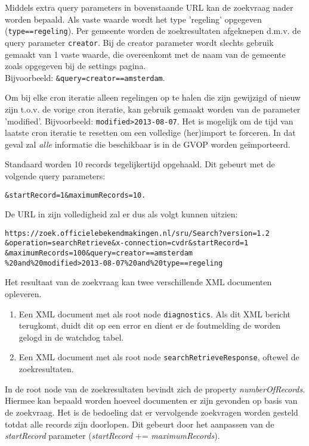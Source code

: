 Middels extra query parameters in bovenstaande URL kan de zoekvraag nader worden bepaald. Als vaste waarde wordt het type 'regeling' opgegeven (\texttt{type==regeling}). Per gemeente worden de zoekresultaten afgeknepen d.m.v. de query parameter \texttt{creator}. Bij de creator parameter wordt slechts gebruik gemaakt van 1 vaste waarde, die overeenkomt met de naam van de gemeente zoals opgegeven bij de settings pagina.
\\ Bijvoorbeeld: \texttt{\&query=creator==amsterdam}.

Om bij elke cron iteratie alleen regelingen op te halen die zijn gewijzigd of nieuw zijn t.o.v. de vorige cron iteratie, kan gebruik gemaakt worden van de parameter 'modified'. Bijvoorbeeld: \texttt{modified\textgreater2013-08-07}. Het is mogelijk om de tijd van laatste cron iteratie te resetten om een volledige (her)import te forceren. In dat geval zal \emph{alle} informatie die beschikbaar is in de GVOP worden ge\"{i}mporteerd.

Standaard worden 10 records tegelijkertijd opgehaald. Dit gebeurt met de volgende query parameters:
\begin{verbatim}
&startRecord=1&maximumRecords=10.
\end{verbatim}

De URL in zijn volledigheid zal er dus als volgt kunnen uitzien:

\begin{verbatim}
https://zoek.officielebekendmakingen.nl/sru/Search?version=1.2
&operation=searchRetrieve&x-connection=cvdr&startRecord=1
&maximumRecords=100&query=creator==amsterdam
%20and%20modified>2013-08-07%20and%20type==regeling
\end{verbatim}

Het resultaat van de zoekvraag kan twee verschillende XML documenten opleveren.

\begin{enumerate}
\item Een XML document met als root node \texttt{diagnostics}. Als dit XML bericht terugkomt, duidt dit op een error en dient er de foutmelding de worden gelogd in de watchdog tabel.
\item Een XML document met als root node \texttt{searchRetrieveResponse}, oftewel de zoekresultaten.
\end{enumerate}

In de root node van de zoekresultaten bevindt zich de property \emph{numberOfRecords}. Hiermee kan bepaald worden hoeveel documenten er zijn gevonden op basis van de zoekvraag. Het is de bedoeling dat er vervolgende zoekvragen worden gesteld totdat alle records zijn doorlopen. Dit gebeurt door het aanpassen van de \emph{startRecord} parameter (\emph{startRecord} += \emph{maximumRecords}).

